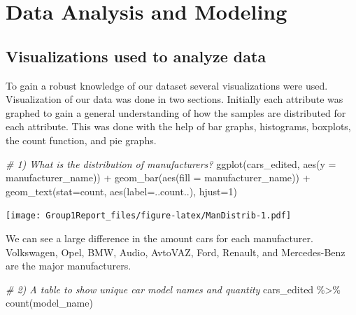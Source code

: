 \documentclass[
]{article}
\newenvironment{Shaded}{\begin{snugshade}}{\end{snugshade}}
\newcommand{\AttributeTok}[1]{\textcolor[rgb]{0.77,0.63,0.00}{#1}}
\newcommand{\CommentTok}[1]{\textcolor[rgb]{0.56,0.35,0.01}{\textit{#1}}}
\newcommand{\DecValTok}[1]{\textcolor[rgb]{0.00,0.00,0.81}{#1}}
\newcommand{\FunctionTok}[1]{\textcolor[rgb]{0.00,0.00,0.00}{#1}}
\newcommand{\NormalTok}[1]{#1}
\newcommand{\SpecialCharTok}[1]{\textcolor[rgb]{0.00,0.00,0.00}{#1}}
\newcommand{\StringTok}[1]{\textcolor[rgb]{0.31,0.60,0.02}{#1}}
\begin{document}
\hypertarget{data-analysis-and-modeling}{%
\section{Data Analysis and Modeling}\label{data-analysis-and-modeling}}

\hypertarget{visualizations-used-to-analyze-data}{%
\subsection{Visualizations used to analyze
data}\label{visualizations-used-to-analyze-data}}

To gain a robust knowledge of our dataset several visualizations were
used. Visualization of our data was done in two sections. Initially each
attribute was graphed to gain a general understanding of how the samples
are distributed for each attribute. This was done with the help of bar
graphs, histograms, boxplots, the count function, and pie graphs.

\begin{Shaded}
\begin{Highlighting}[]
\CommentTok{\# 1) What is the distribution of manufacturers?}
\FunctionTok{ggplot}\NormalTok{(cars\_edited, }\FunctionTok{aes}\NormalTok{(}\AttributeTok{y =}\NormalTok{ manufacturer\_name)) }\SpecialCharTok{+} \FunctionTok{geom\_bar}\NormalTok{(}\FunctionTok{aes}\NormalTok{(}\AttributeTok{fill =}\NormalTok{ manufacturer\_name)) }\SpecialCharTok{+} \FunctionTok{geom\_text}\NormalTok{(}\AttributeTok{stat=}\StringTok{\textquotesingle{}count\textquotesingle{}}\NormalTok{, }\FunctionTok{aes}\NormalTok{(}\AttributeTok{label=}\NormalTok{..count..), }\AttributeTok{hjust=}\DecValTok{1}\NormalTok{)}
\end{Highlighting}
\end{Shaded}

\texttt{[image: Group1Report\_files/figure-latex/ManDistrib-1.pdf]}

We can see a large difference in the amount cars for each manufacturer.
Volkswagen, Opel, BMW, Audio, AvtoVAZ, Ford, Renault, and Mercedes-Benz
are the major manufacturers.

\begin{Shaded}
\begin{Highlighting}[]
\CommentTok{\# 2) A table to show unique car model names and quantity}
\NormalTok{cars\_edited }\SpecialCharTok{\%\textgreater{}\%} \FunctionTok{count}\NormalTok{(model\_name)}
\end{Highlighting}
\end{Shaded}
\end{document}
